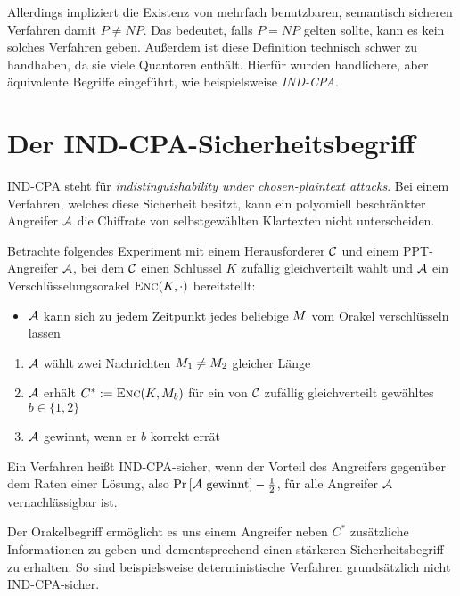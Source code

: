 Allerdings impliziert die Existenz von mehrfach benutzbaren, semantisch sicheren Verfahren damit $P \neq NP$. Das bedeutet, falls $P = NP$ gelten sollte, kann
es kein solches Verfahren geben. Außerdem ist diese Definition technisch schwer zu handhaben, da sie viele Quantoren enthält. Hierfür wurden handlichere, aber äquivalente Begriffe eingeführt, wie beispielsweise \emph{IND-CPA}.

\section{Der IND-CPA-Sicherheitsbegriff}\label{def:ind-cpa}
IND-CPA steht für \emph{indistinguishability under chosen-plaintext
  attacks}. Bei einem Verfahren, welches diese Sicherheit besitzt, kann
ein polyomiell beschränkter Angreifer $\mathcal{A}$ die Chiffrate von
selbstgewählten Klartexten nicht unterscheiden.
\begin{definition}
	Betrachte folgendes Experiment mit einem Herausforderer $\mathcal{C}$ und einem PPT-Angreifer $\mathcal{A}$, bei dem $\mathcal{C}$ einen Schlüssel $K$ zufällig gleichverteilt wählt und $\mathcal{A}$ ein Verschlüsselungsorakel $\textsc{Enc}(K,\cdot)$ bereitstellt: 
	\begin{itemize}
		\item $\mathcal{A}$ kann sich zu jedem Zeitpunkt jedes beliebige $M$ vom Orakel verschlüsseln lassen
	\end{itemize}
	\begin{enumerate}
		\item $\mathcal{A}$ wählt zwei Nachrichten $M_1 \neq M_2$ gleicher Länge
		\item $\mathcal{A}$ erhält $C^{*} := \textsc{Enc}(K, M_{b})$ für ein von $\mathcal{C}$ zufällig gleichverteilt gewähltes $b \in \{1, 2\}$
		\item $\mathcal{A}$ gewinnt, wenn er $b$ korrekt errät
	\end{enumerate}
	Ein Verfahren heißt IND-CPA-sicher, wenn der Vorteil des Angreifers gegenüber dem Raten einer Lösung, also $\Pr \left[ \mathcal{A} \textnormal{ gewinnt} \right] - \frac{1}{2}$, für alle Angreifer $\mathcal{A}$ vernachlässigbar ist. 
\end{definition}
Der Orakelbegriff ermöglicht es uns einem Angreifer neben $C^{\ast}$ zusätzliche Informationen zu geben und dementsprechend einen stärkeren Sicherheitsbegriff zu erhalten. So sind beispielsweise deterministische Verfahren grundsätzlich nicht IND-CPA-sicher.
